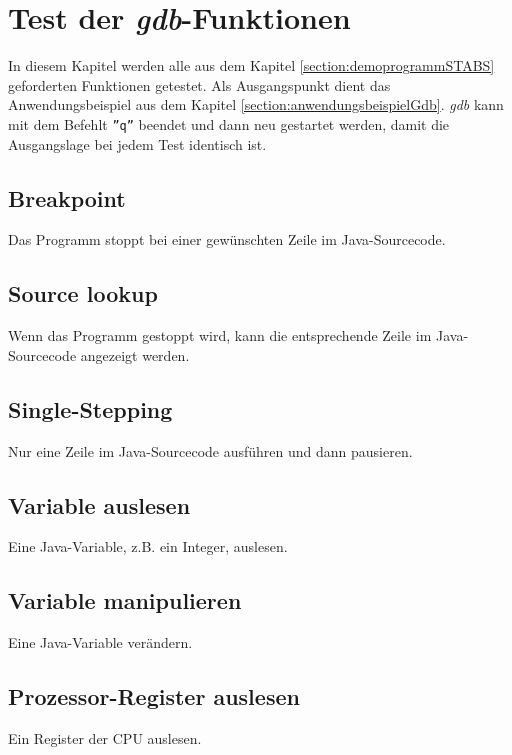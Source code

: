 \section{Test der \textit{gdb}-Funktionen}
In diesem Kapitel werden alle aus dem Kapitel \ref{section:demoprogrammSTABS} geforderten Funktionen getestet.
Als Ausgangspunkt dient das Anwendungsbeispiel aus dem Kapitel \ref{section:anwendungsbeispielGdb}.
\textit{gdb} kann mit dem Befehlt \texttt{''q''} beendet und dann neu gestartet werden, damit die Ausgangslage bei jedem Test identisch ist.

\subsection{Breakpoint}
Das Programm stoppt bei einer gewünschten Zeile im Java-Sourcecode.

\subsection{Source lookup}
Wenn das Programm gestoppt wird, kann die entsprechende Zeile im Java-Sourcecode angezeigt werden.

\subsection{Single-Stepping}
Nur eine Zeile im Java-Sourcecode ausführen und dann pausieren.

\subsection{Variable auslesen}
Eine Java-Variable, z.B. ein Integer, auslesen.

\subsection{Variable manipulieren}
Eine Java-Variable verändern.

\subsection{Prozessor-Register auslesen}
Ein Register der CPU auslesen.






